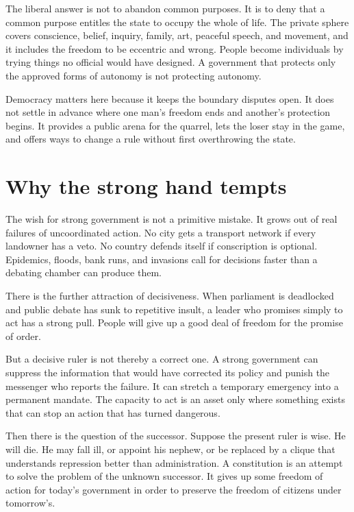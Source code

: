 \documentclass[12pt,a4paper]{book}
\begin{document}
The liberal answer is not to abandon common purposes. It is to deny that a common purpose entitles the state to occupy the whole of life. The private sphere covers conscience, belief, inquiry, family, art, peaceful speech, and movement, and it includes the freedom to be eccentric and wrong. People become individuals by trying things no official would have designed. A government that protects only the approved forms of autonomy is not protecting autonomy.

Democracy matters here because it keeps the boundary disputes open. It does not settle in advance where one man's freedom ends and another's protection begins. It provides a public arena for the quarrel, lets the loser stay in the game, and offers ways to change a rule without first overthrowing the state.

\section{Why the strong hand tempts}

The wish for strong government is not a primitive mistake. It grows out of real failures of uncoordinated action. No city gets a transport network if every landowner has a veto. No country defends itself if conscription is optional. Epidemics, floods, bank runs, and invasions call for decisions faster than a debating chamber can produce them.

There is the further attraction of decisiveness. When parliament is deadlocked and public debate has sunk to repetitive insult, a leader who promises simply to act has a strong pull. People will give up a good deal of freedom for the promise of order.

But a decisive ruler is not thereby a correct one. A strong government can suppress the information that would have corrected its policy and punish the messenger who reports the failure. It can stretch a temporary emergency into a permanent mandate. The capacity to act is an asset only where something exists that can stop an action that has turned dangerous.

Then there is the question of the successor. Suppose the present ruler is wise. He will die. He may fall ill, or appoint his nephew, or be replaced by a clique that understands repression better than administration. A constitution is an attempt to solve the problem of the unknown successor. It gives up some freedom of action for today's government in order to preserve the freedom of citizens under tomorrow's.
\end{document}
